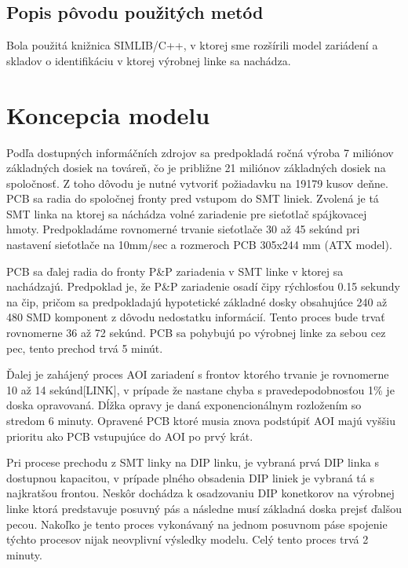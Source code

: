 \documentclass[12pt,a4paper,titlepage,final]{article}
\begin{document}
\subsection{Popis pôvodu použitých metód}
Bola použitá knižnica SIMLIB/C++, v ktorej sme rozšírili model zariádení a 
skladov o identifikáciu v ktorej výrobnej linke sa nachádza.

\section{Koncepcia modelu}

Podľa dostupných informáčních zdrojov sa predpokladá ročná výroba 7 miliónov
základných dosiek na továreň, čo je približne 21 miliónov základných dosiek
na spoločnosť. Z toho dôvodu je nutné vytvoriť požiadavku na 19179 kusov deňne.
PCB sa radia do spoločnej fronty pred vstupom do SMT liniek. Zvolená je tá SMT
linka na ktorej sa náchádza volné zariadenie pre sieťotlač spájkovacej hmoty.
Predpokladáme rovnomerné trvanie sieťotlače 30 až 45 sekúnd pri nastavení sieťotlače
na 10mm/sec a rozmeroch PCB 305x244 mm (ATX model).

PCB sa ďalej radia do fronty P\&P zariadenia v SMT linke v ktorej sa nachádzajú.
Predpoklad je, že P\&P zariadenie osadí čipy rýchlosťou 0.15 sekundy na čip, pričom
sa predpokladajú hypotetické základné dosky obsahujúce 240 až 480 SMD komponent
z dôvodu nedostatku informácií. Tento proces bude trvať rovnomerne 36 až 72 sekúnd.
PCB sa pohybujú po výrobnej linke za sebou cez pec, tento prechod trvá 5 minút.

Ďalej je zahájený proces AOI zariadení s frontov ktorého trvanie je rovnomerne 10 až 14 sekúnd[LINK], v 
prípade že nastane chyba s pravedepodobnosťou 1\% je doska opravovaná. Dĺžka
opravy je daná exponencionálnym rozložením so stredom 6 minuty. Opravené PCB
ktoré musia znova podstúpiť AOI majú vyššiu prioritu ako PCB vstupujúce do AOI 
po prvý krát.

Pri procese prechodu z SMT linky na DIP linku, je vybraná prvá DIP linka s dostupnou
kapacitou, v prípade plného obsadenia DIP liniek je vybraná tá s najkratšou
frontou. Neskôr dochádza k osadzovaniu DIP konetkorov na výrobnej linke
ktorá predstavuje posuvný pás a následne musí základná doska prejsť ďalšou
pecou. Nakoľko je tento proces vykonávaný na jednom posuvnom páse spojenie týchto
procesov nijak neovplivní výsledky modelu. Celý tento proces trvá 2 minuty.
\end{document}
